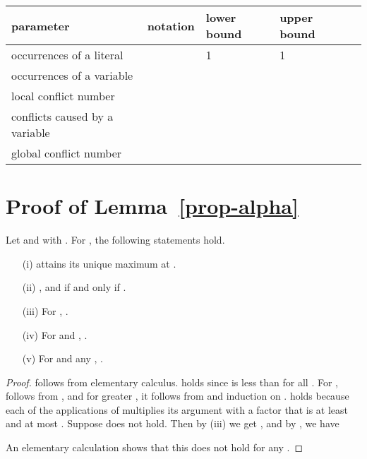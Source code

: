 \documentclass[a4paper, 11pt]{article}
\begin{document}
\begin{table}[htbp]
  \centering
  \begin{tabular}{lllll}
    parameter & notation & lower bound & upper bound\\\hline
    occurrences of a literal &  & 1 & 1\\
    occurrences of a variable &  & 
    ~\cite{KST1993} & ~\cite{Gebauer2009}\\
    local conflict number &  & ~\cite{KST1993} & \\
    conflicts caused by a variable \hspace{2mm} &  & 
    ~\cite{KST1993} & \\
    global conflict number &  &  & 
  \end{tabular}
\end{table}





\newpage
\appendix

\section{Proof of Lemma~\ref{prop-alpha}}

\begin{proposition}
  Let  and  with . For , the following statements hold.
  \begin{itemize}
    
  \item[(i)]  attains its unique maximum at
    .
  \item[(ii)] , and  if and only if .
  \item[(iii)] For , .
  \item[(iv)] For  and ,
    .
  \item[(v)] For  and any , .
  \end{itemize}
  \label{prop-ell}
\end{proposition}

\begin{proof}
   follows from elementary calculus.  holds since
   is less than  for all . For ,
   follows from , and for greater , it follows from
   and induction on .  holds because each of the
   applications of  multiplies its argument with a factor
  that is at least  and at most .  Suppose  does not hold. Then by (iii) we get
  , and by , we have
  
  An elementary calculation shows that this does not hold for any 
  .
\end{proof}
\end{document}
